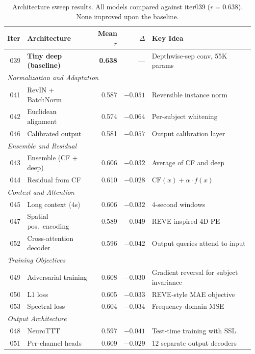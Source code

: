 \documentclass[11pt,a4paper]{article}
\begin{document}
\begin{table}[H]
\centering
\caption{Architecture sweep results. All models compared against iter039
  ($r = 0.638$). None improved upon the baseline.}
\begin{tabular}{rlrrl}
\toprule
Iter & Architecture & Mean $r$ & $\Delta$ & Key Idea \\
\midrule
039 & \textbf{Tiny deep (baseline)} & \textbf{0.638} & --- & Depthwise-sep conv, 55K params \\
\midrule
\multicolumn{5}{l}{\textit{Normalization and Adaptation}} \\
041 & RevIN + BatchNorm & 0.587 & \textcolor{bad}{$-0.051$} & Reversible instance norm \\
042 & Euclidean alignment & 0.574 & \textcolor{bad}{$-0.064$} & Per-subject whitening \\
046 & Calibrated output & 0.581 & \textcolor{bad}{$-0.057$} & Output calibration layer \\
\midrule
\multicolumn{5}{l}{\textit{Ensemble and Residual}} \\
043 & Ensemble (CF + deep) & 0.606 & \textcolor{bad}{$-0.032$} & Average of CF and deep \\
044 & Residual from CF & 0.610 & \textcolor{bad}{$-0.028$} & $\text{CF}(x) + \alpha \cdot f(x)$ \\
\midrule
\multicolumn{5}{l}{\textit{Context and Attention}} \\
045 & Long context (4s) & 0.606 & \textcolor{bad}{$-0.032$} & 4-second windows \\
047 & Spatial pos.\ encoding & 0.589 & \textcolor{bad}{$-0.049$} & REVE-inspired 4D PE \\
052 & Cross-attention decoder & 0.596 & \textcolor{bad}{$-0.042$} & Output queries attend to input \\
\midrule
\multicolumn{5}{l}{\textit{Training Objectives}} \\
049 & Adversarial training & 0.608 & \textcolor{bad}{$-0.030$} & Gradient reversal for subject invariance \\
050 & L1 loss & 0.605 & \textcolor{bad}{$-0.033$} & REVE-style MAE objective \\
053 & Spectral loss & 0.604 & \textcolor{bad}{$-0.034$} & Frequency-domain MSE \\
\midrule
\multicolumn{5}{l}{\textit{Output Architecture}} \\
048 & NeuroTTT & 0.597 & \textcolor{bad}{$-0.041$} & Test-time training with SSL \\
051 & Per-channel heads & 0.609 & \textcolor{bad}{$-0.029$} & 12 separate output decoders \\
\bottomrule
\end{tabular}
\end{table}
\end{document}
